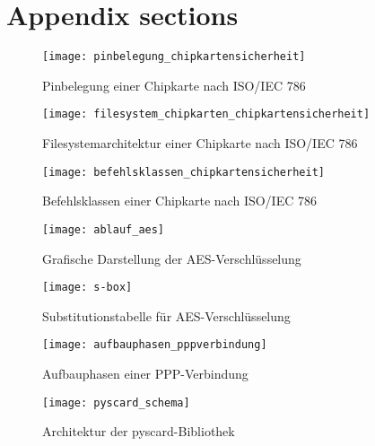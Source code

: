 \section{Appendix sections}

 \begin{figure}[htp]
  \begin{center}
   \texttt{[image: pinbelegung\_chipkartensicherheit]}
  \end{center}
  \caption[Pinbelegung einer Chipkarte]{Pinbelegung einer Chipkarte nach ISO/IEC 786 \cite{spitz11}}
  \label{abb:pinbelegung_chipkarten}
 \end{figure}

 \begin{figure}[htp]
  \begin{center}
   \texttt{[image: filesystem\_chipkarten\_chipkartensicherheit]}
  \end{center}
  \caption[Filesystemarchitektur einer Chipkarte]{Filesystemarchitektur einer Chipkarte nach ISO/IEC 786 \cite{spitz11}}
  \label{abb:filesystem_chipkarten}
 \end{figure}

  \begin{figure}[htp]
  \begin{center}
   \texttt{[image: befehlsklassen\_chipkartensicherheit]}
  \end{center}
  \caption[Befehlsklassen einer Chipkarte]{Befehlsklassen einer Chipkarte nach ISO/IEC 786 \cite{spitz11}}
  \label{abb:befehlsklassen_chipkarten}
 \end{figure}

  \begin{figure}[htp]
  \begin{center}
   \texttt{[image: ablauf\_aes]}
  \end{center}
  \caption[Grafische Darstellung der AES-Verschlüsselung]{Grafische Darstellung der AES-Verschlüsselung \cite{paar10}}
  \label{abb:funktion_aes}
 \end{figure}
 
  \begin{figure}[htp]
  \begin{center}
   \texttt{[image: s-box]}
  \end{center}
  \caption[Substitutionstabelle für AES-Verschlüsselung]{Substitutionstabelle für AES-Verschlüsselung \cite{paar10}}
  \label{abb:s-box}
 \end{figure}
 
 \begin{figure}[htp]
  \begin{center}
   \texttt{[image: aufbauphasen\_pppverbindung]}
  \end{center}
  \caption[Aufbauphasen einer PPP-Verbindung]{Aufbauphasen einer PPP-Verbindung \cite{zackercomptia}}
  \label{abb:aufbauphasen_pppverbindung}
 \end{figure}

 \begin{figure}[htp]
  \begin{center}
   \texttt{[image: pyscard\_schema]}
  \end{center}
  \caption[Architektur der pyscard-Bibliothek]{Architektur der pyscard-Bibliothek \cite{pyscardweb}}
  \label{abb:pyscard_schema}
 \end{figure}